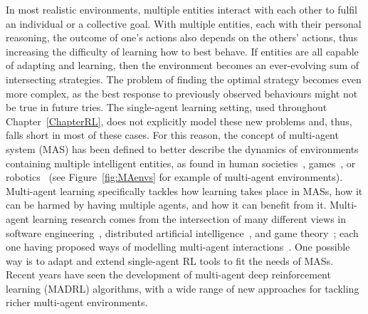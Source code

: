 In most realistic environments, multiple entities interact with each other to fulfil an individual or a collective goal. With multiple entities, each with their personal reasoning, the outcome of one's actions also depends on the others' actions, thus increasing the difficulty of learning how to best behave. If entities are all capable of adapting and learning, then the environment becomes an ever-evolving sum of intersecting strategies. The problem of finding the optimal strategy becomes even more complex, as the best response to previously observed behaviours might not be true in future tries. The single-agent learning setting, used throughout Chapter~\ref{ChapterRL}, does not explicitly model these new problems and, thus, falls short in most of these cases. For this reason, the concept of multi-agent system (MAS) has been defined to better describe the dynamics of environments containing multiple intelligent entities, as found in human societies~\citep{Doran1995_EOS, Bousquet2004_MASEcosystem, Hamill2015_ABMEconomics}, games~\citep{Nowé2012_GameTheory, Owen2013_GameTheory}, or robotics~\citep{Parker2016_MRS, Rizk2019_CoopHeteroMRS} (see Figure~\ref{fig:MAenvs} for example of multi-agent environments). Multi-agent learning specifically tackles how learning takes place in MASs, how it can be harmed by having multiple agents, and how it can benefit from it. Multi-agent learning research comes from the intersection of many different views in software engineering~\citep{Ben-Ari2006_DistribProg}, distributed artificial intelligence~\citep{Stone2000_MASMachineLearning}, and game theory~\citep{Rosenschein1994_Encounter, LeytonBrown2008_GameTheory}; each one having proposed ways of modelling multi-agent interactions~\citep{Wooldridge2009_IntroMAS}. One possible way is to adapt and extend single-agent RL tools to fit the needs of MASs. Recent years have seen the development of multi-agent deep reinforcement learning (MADRL) algorithms, with a wide range of new approaches for tackling richer multi-agent environments. 

